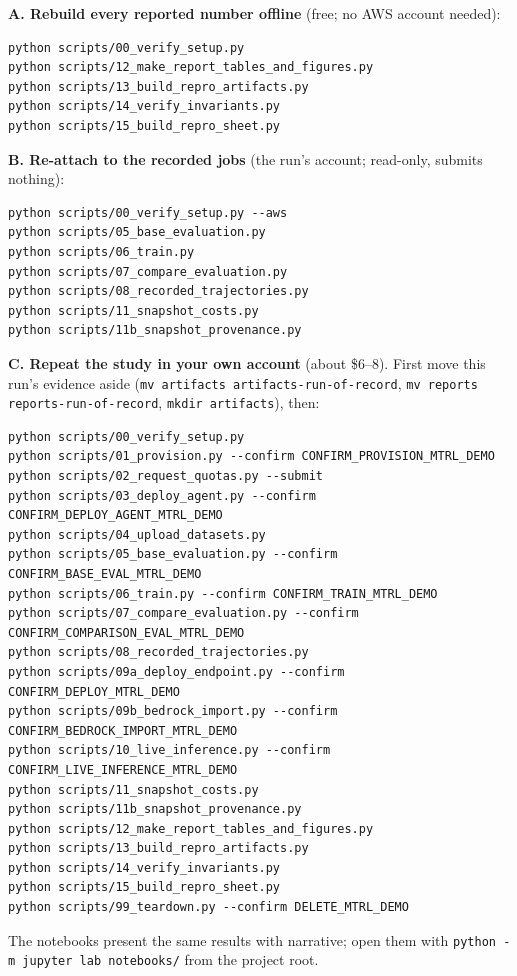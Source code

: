 \documentclass[11pt]{article}
\begin{document}
\textbf{A. Rebuild every reported number offline} (free; no AWS account needed):
\begin{Verbatim}[frame=single,fontsize=\small]
python scripts/00_verify_setup.py
python scripts/12_make_report_tables_and_figures.py
python scripts/13_build_repro_artifacts.py
python scripts/14_verify_invariants.py
python scripts/15_build_repro_sheet.py
\end{Verbatim}
\textbf{B. Re-attach to the recorded jobs} (the run's account; read-only, submits nothing):
\begin{Verbatim}[frame=single,fontsize=\small]
python scripts/00_verify_setup.py --aws
python scripts/05_base_evaluation.py
python scripts/06_train.py
python scripts/07_compare_evaluation.py
python scripts/08_recorded_trajectories.py
python scripts/11_snapshot_costs.py
python scripts/11b_snapshot_provenance.py
\end{Verbatim}
\textbf{C. Repeat the study in your own account} (about \$6--8). First move this run's evidence aside
(\texttt{mv artifacts artifacts-run-of-record}, \texttt{mv reports reports-run-of-record},
\texttt{mkdir artifacts}), then:
\begin{Verbatim}[frame=single,fontsize=\small]
python scripts/00_verify_setup.py
python scripts/01_provision.py --confirm CONFIRM_PROVISION_MTRL_DEMO
python scripts/02_request_quotas.py --submit
python scripts/03_deploy_agent.py --confirm CONFIRM_DEPLOY_AGENT_MTRL_DEMO
python scripts/04_upload_datasets.py
python scripts/05_base_evaluation.py --confirm CONFIRM_BASE_EVAL_MTRL_DEMO
python scripts/06_train.py --confirm CONFIRM_TRAIN_MTRL_DEMO
python scripts/07_compare_evaluation.py --confirm CONFIRM_COMPARISON_EVAL_MTRL_DEMO
python scripts/08_recorded_trajectories.py
python scripts/09a_deploy_endpoint.py --confirm CONFIRM_DEPLOY_MTRL_DEMO
python scripts/09b_bedrock_import.py --confirm CONFIRM_BEDROCK_IMPORT_MTRL_DEMO
python scripts/10_live_inference.py --confirm CONFIRM_LIVE_INFERENCE_MTRL_DEMO
python scripts/11_snapshot_costs.py
python scripts/11b_snapshot_provenance.py
python scripts/12_make_report_tables_and_figures.py
python scripts/13_build_repro_artifacts.py
python scripts/14_verify_invariants.py
python scripts/15_build_repro_sheet.py
python scripts/99_teardown.py --confirm DELETE_MTRL_DEMO
\end{Verbatim}
The notebooks present the same results with narrative; open them with
\texttt{python -m jupyter lab notebooks/} from the project root.
\end{document}
